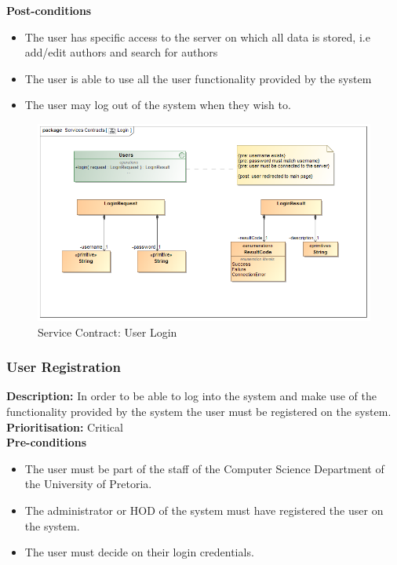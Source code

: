 \documentclass[a4paper]{article}
\begin{document}
    \textbf{Post-conditions}
     \begin{itemize}
        \item The user has specific access to the server on which all data is stored, i.e add/edit authors and search for authors
        \item The user is able to use all the user functionality provided by the system 
        \item The user may log out of the system when they wish to.
    \end{itemize}
    
        	\begin{figure}[H]
        		\centering
        		\includegraphics[width=\textwidth]{5.1.1.Login.Services.Contract.png}
        		\caption{Service Contract: User Login}
        	\end{figure}
    
    \pagebreak
    
    \subsubsection{User Registration}
    
    \textbf{Description:}  In order to be able to log into the system and make use of the functionality provided by the system the user must be registered on the system. \\
    \textbf{Prioritisation:} Critical\\
   
    \textbf{Pre-conditions}
     \begin{itemize}
        \item The user must be part of the staff of the Computer Science Department of the University of Pretoria.
        \item The administrator or HOD of the system must have registered the user on the system.
        \item The user must decide on their login credentials.
   \end{itemize}
    
\end{document}
